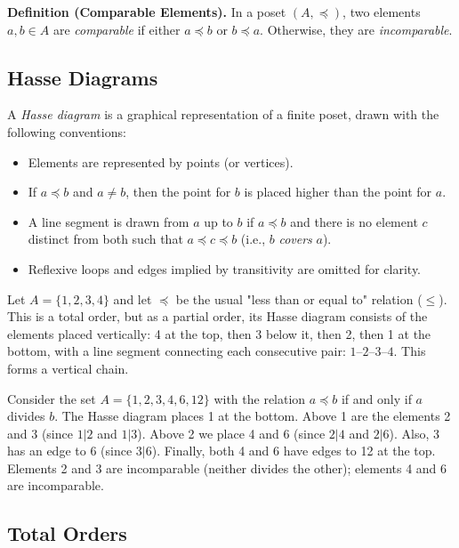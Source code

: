 \documentclass[11pt,a4paper]{article}
\begin{document}
\textbf{Definition (Comparable Elements).} In a poset $(A, \preceq)$, two elements $a, b \in A$ are \textit{comparable} if either $a \preceq b$ or $b \preceq a$. Otherwise, they are \textit{incomparable}.

\subsection{Hasse Diagrams}

A \textit{Hasse diagram} is a graphical representation of a finite poset, drawn with the following conventions:
\begin{itemize}
    \item Elements are represented by points (or vertices).
    \item If $a \preceq b$ and $a \neq b$, then the point for $b$ is placed higher than the point for $a$.
    \item A line segment is drawn from $a$ up to $b$ if $a \preceq b$ and there is no element $c$ distinct from both such that $a \preceq c \preceq b$ (i.e., $b$ \textit{covers} $a$).
    \item Reflexive loops and edges implied by transitivity are omitted for clarity.
\end{itemize}

\begin{example}
Let $A = \{1, 2, 3, 4\}$ and let $\preceq$ be the usual "less than or equal to" relation ($\leq$). This is a total order, but as a partial order, its Hasse diagram consists of the elements placed vertically: 4 at the top, then 3 below it, then 2, then 1 at the bottom, with a line segment connecting each consecutive pair: $1$--$2$--$3$--$4$. This forms a vertical chain.
\end{example}

\begin{example}
Consider the set $A = \{1, 2, 3, 4, 6, 12\}$ with the relation $a \preceq b$ if and only if $a$ divides $b$. The Hasse diagram places 1 at the bottom. Above 1 are the elements 2 and 3 (since $1|2$ and $1|3$). Above 2 we place 4 and 6 (since $2|4$ and $2|6$). Also, 3 has an edge to 6 (since $3|6$). Finally, both 4 and 6 have edges to 12 at the top. Elements 2 and 3 are incomparable (neither divides the other); elements 4 and 6 are incomparable.
\end{example}

\subsection{Total Orders}
\end{document}

